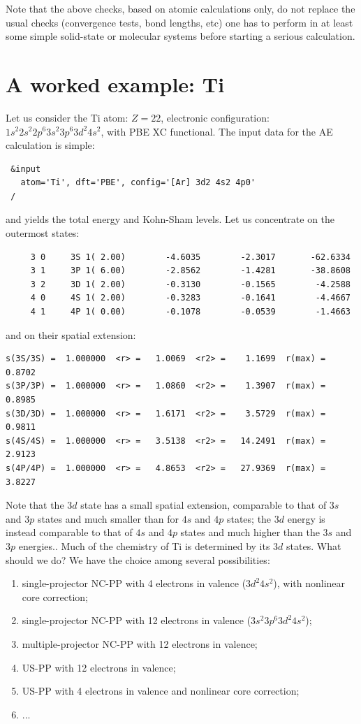 \documentclass[12pt,a4paper]{article}
\begin{document}
Note that the above checks, based on atomic calculations only,
do not replace the usual checks (convergence tests, bond lengths,
etc) one has to perform in at least some simple solid-state or 
molecular systems before starting a serious calculation.

\section{A worked example: Ti}

Let us consider the Ti atom: $Z=22$, electronic configuration: 
$1s^2 2s^2 2p^6 3s^2 3p^6 3d^2 4s^2$, with PBE XC functional.
The input data for the AE calculation is simple:
\begin{verbatim}
 &input
   atom='Ti', dft='PBE', config='[Ar] 3d2 4s2 4p0'
 /
\end{verbatim}
and yields the total energy and Kohn-Sham levels. Let us concentrate
on the outermost states:
\begin{verbatim}
     3 0     3S 1( 2.00)        -4.6035        -2.3017       -62.6334
     3 1     3P 1( 6.00)        -2.8562        -1.4281       -38.8608
     3 2     3D 1( 2.00)        -0.3130        -0.1565        -4.2588
     4 0     4S 1( 2.00)        -0.3283        -0.1641        -4.4667
     4 1     4P 1( 0.00)        -0.1078        -0.0539        -1.4663
\end{verbatim}
and on their spatial extension:
\begin{verbatim}
s(3S/3S) =  1.000000  <r> =   1.0069  <r2> =    1.1699  r(max) =   0.8702
s(3P/3P) =  1.000000  <r> =   1.0860  <r2> =    1.3907  r(max) =   0.8985
s(3D/3D) =  1.000000  <r> =   1.6171  <r2> =    3.5729  r(max) =   0.9811
s(4S/4S) =  1.000000  <r> =   3.5138  <r2> =   14.2491  r(max) =   2.9123
s(4P/4P) =  1.000000  <r> =   4.8653  <r2> =   27.9369  r(max) =   3.8227
\end{verbatim}
Note that the $3d$ state has a small spatial extension, comparable to that of
$3s$ and $3p$ states and much smaller than for $4s$ and $4p$ states; the
$3d$ energy is instead comparable to that of $4s$ and $4p$ states and much
higher than the $3s$ and $3p$ energies.. Much of the chemistry of Ti is 
determined by its $3d$ states. What should we do? We have the choice among 
several possibilities:
\begin{enumerate}
\item single-projector NC-PP with 4 electrons in valence ($3d^2 4s^2$),
with nonlinear core correction;
\item single-projector NC-PP with 12 electrons in valence 
($3s^2 3p^6 3d^2 4s^2$);
\item multiple-projector NC-PP with 12 electrons in valence;
\item US-PP with 12 electrons in valence;
\item US-PP with 4 electrons in valence and nonlinear core correction;
\item ...
\end{enumerate}
\end{document}
